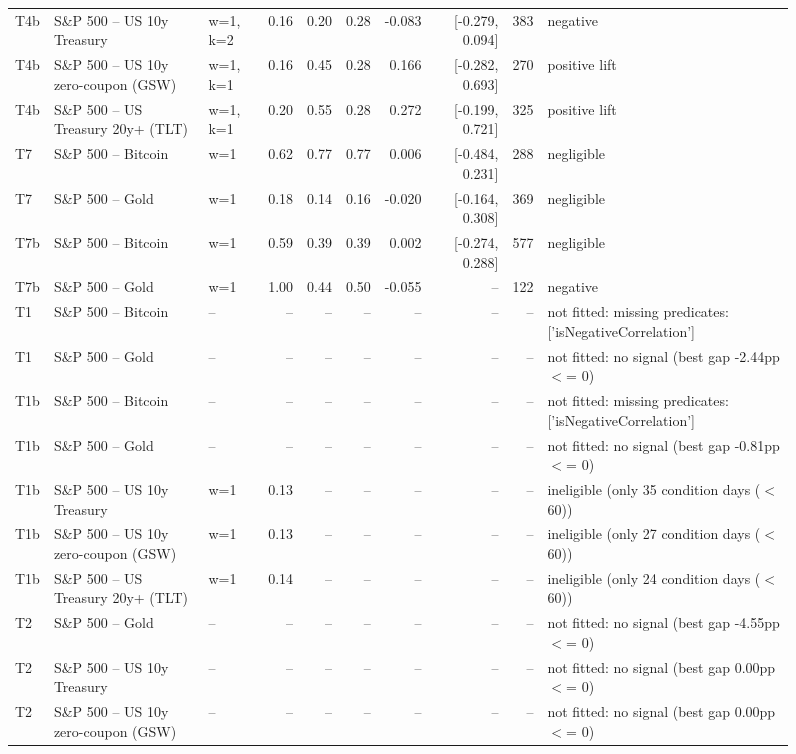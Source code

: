 \begin{figure}
\begin{tabular}{lllrrrrrrl}
T4b & S\&P 500 -- US 10y Treasury & w=1, k=2 & 0.16 & 0.20 & 0.28 & -0.083 & [-0.279, 0.094] & 383 & negative \\
T4b & S\&P 500 -- US 10y zero-coupon (GSW) & w=1, k=1 & 0.16 & 0.45 & 0.28 & 0.166 & [-0.282, 0.693] & 270 & positive lift \\
T4b & S\&P 500 -- US Treasury 20y+ (TLT) & w=1, k=1 & 0.20 & 0.55 & 0.28 & 0.272 & [-0.199, 0.721] & 325 & positive lift \\
T7 & S\&P 500 -- Bitcoin & w=1 & 0.62 & 0.77 & 0.77 & 0.006 & [-0.484, 0.231] & 288 & negligible \\
T7 & S\&P 500 -- Gold & w=1 & 0.18 & 0.14 & 0.16 & -0.020 & [-0.164, 0.308] & 369 & negligible \\
T7b & S\&P 500 -- Bitcoin & w=1 & 0.59 & 0.39 & 0.39 & 0.002 & [-0.274, 0.288] & 577 & negligible \\
T7b & S\&P 500 -- Gold & w=1 & 1.00 & 0.44 & 0.50 & -0.055 & -- & 122 & negative \\
T1 & S\&P 500 -- Bitcoin & -- & -- & -- & -- & -- & -- & -- & not fitted: missing predicates: ['isNegativeCorrelation'] \\
T1 & S\&P 500 -- Gold & -- & -- & -- & -- & -- & -- & -- & not fitted: no signal (best gap -2.44pp $<$= 0) \\
T1b & S\&P 500 -- Bitcoin & -- & -- & -- & -- & -- & -- & -- & not fitted: missing predicates: ['isNegativeCorrelation'] \\
T1b & S\&P 500 -- Gold & -- & -- & -- & -- & -- & -- & -- & not fitted: no signal (best gap -0.81pp $<$= 0) \\
T1b & S\&P 500 -- US 10y Treasury & w=1 & 0.13 & -- & -- & -- & -- & -- & ineligible (only 35 condition days ($<$ 60)) \\
T1b & S\&P 500 -- US 10y zero-coupon (GSW) & w=1 & 0.13 & -- & -- & -- & -- & -- & ineligible (only 27 condition days ($<$ 60)) \\
T1b & S\&P 500 -- US Treasury 20y+ (TLT) & w=1 & 0.14 & -- & -- & -- & -- & -- & ineligible (only 24 condition days ($<$ 60)) \\
T2 & S\&P 500 -- Gold & -- & -- & -- & -- & -- & -- & -- & not fitted: no signal (best gap -4.55pp $<$= 0) \\
T2 & S\&P 500 -- US 10y Treasury & -- & -- & -- & -- & -- & -- & -- & not fitted: no signal (best gap 0.00pp $<$= 0) \\
T2 & S\&P 500 -- US 10y zero-coupon (GSW) & -- & -- & -- & -- & -- & -- & -- & not fitted: no signal (best gap 0.00pp $<$= 0) \\

\end{tabular}
\end{figure}
